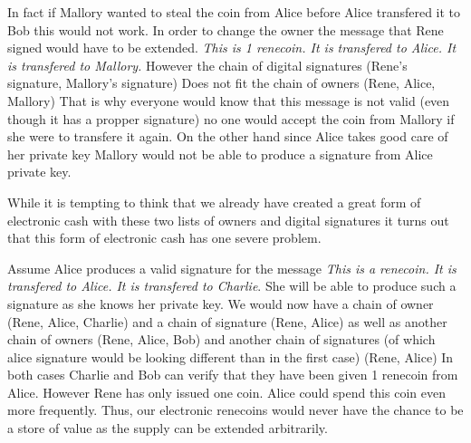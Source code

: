 \documentclass[ebook,12pt,oneside,openany]{memoir}
\begin{document}


In fact if Mallory wanted to steal the coin from Alice before Alice transfered it to Bob this would not work.
In order to change the owner the message that Rene signed would have to be extended. 
\textit{This is 1 renecoin. It is transfered to Alice. It is transfered to Mallory.}
However the chain of digital signatures (Rene's signature, Mallory's signature) Does not fit the chain of owners (Rene, Alice, Mallory)
That is why everyone would know that this message is not valid (even though it has a propper signature) no one would accept the coin from Mallory if she were to transfere it again.
On the other hand since Alice takes good care of her private key Mallory would not be able to produce a signature from Alice private key.

While it is tempting to think that we already have created a great form of electronic cash with these two lists of owners and digital signatures it turns out that this form of electronic cash has one severe problem.

Assume Alice produces a valid signature for the message \textit{This is a renecoin. It is transfered to Alice. It is transfered to Charlie}.
She will be able to produce such a signature as she knows her private key.
We would now have a chain of owner (Rene, Alice, Charlie) and a chain of signature (Rene, Alice) as well as another chain of owners (Rene, Alice, Bob) and another chain of signatures (of which alice signature would be looking different than in the first case) (Rene, Alice)
In both cases Charlie and Bob can verify that they have been given 1 renecoin from Alice.
However Rene has only issued one coin.
Alice could spend this coin even more frequently.
Thus, our electronic renecoins would never have the chance to be a store of value as the supply can be extended arbitrarily.
\end{document}
